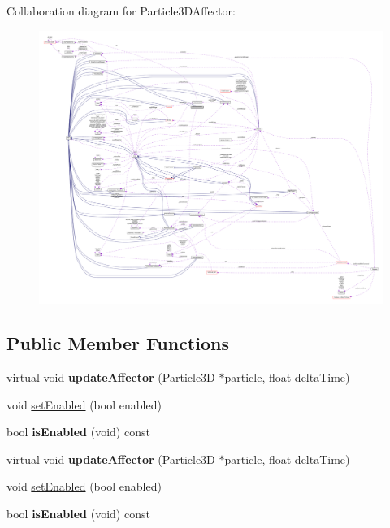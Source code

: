 Collaboration diagram for Particle3\+D\+Affector\+:
\nopagebreak
\begin{figure}[H]
\begin{center}
\leavevmode
\includegraphics[width=350pt]{classParticle3DAffector__coll__graph}
\end{center}
\end{figure}
\subsection*{Public Member Functions}
\begin{DoxyCompactItemize}
\item 
\mbox{\label{classParticle3DAffector_ac8544230ef056b8a68cc5d471be68c54}} 
virtual void {\bfseries update\+Affector} (\hyperlink{structParticle3D}{Particle3D} $\ast$particle, float delta\+Time)
\item 
void \hyperlink{classParticle3DAffector_a5836aa8d810adcaefd9ba19fd40e3615}{set\+Enabled} (bool enabled)
\item 
\mbox{\label{classParticle3DAffector_ac0f2b2816c7f169da1fba61ea9834e98}} 
bool {\bfseries is\+Enabled} (void) const
\item 
\mbox{\label{classParticle3DAffector_a6b883faa92606e1132c39e865f6a16e1}} 
virtual void {\bfseries update\+Affector} (\hyperlink{structParticle3D}{Particle3D} $\ast$particle, float delta\+Time)
\item 
void \hyperlink{classParticle3DAffector_a5836aa8d810adcaefd9ba19fd40e3615}{set\+Enabled} (bool enabled)
\item 
\mbox{\label{classParticle3DAffector_ac0f2b2816c7f169da1fba61ea9834e98}} 
bool {\bfseries is\+Enabled} (void) const
\end{DoxyCompactItemize}
